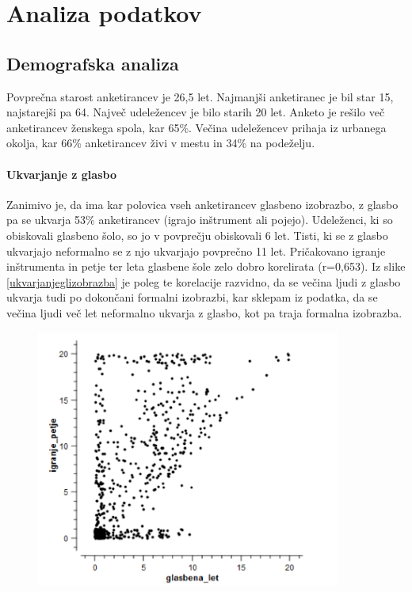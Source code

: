 \documentclass[a4paper, 12pt]{book}
\begin{document}
{\begin{table}[H]
\begin{center}
\begin{tabular}{| p{3.5cm} | p{4.5cm} | p{4.5cm} |}
\end{tabular}
\label{drugidel}
\end{center}
\end{table}

\section{Analiza podatkov}

\subsection{Demografska analiza}

Povprečna starost anketirancev je 26,5 let. Najmanjši anketiranec je bil star 15, najstarejši pa 64. Največ udeležencev je bilo starih 20 let. Anketo je rešilo več anketirancev ženskega spola, kar 65\%. Večina udeležencev prihaja iz urbanega okolja, kar 66\% anketirancev živi v mestu in 34\% na podeželju.

\paragraph{Ukvarjanje z glasbo}

Zanimivo je, da ima kar polovica vseh anketirancev glasbeno izobrazbo, z glasbo pa se ukvarja 53\% anketirancev (igrajo inštrument ali pojejo). Udeleženci, ki so obiskovali glasbeno šolo, so jo v povprečju obiskovali 6 let. Tisti, ki se z glasbo ukvarjajo neformalno se z njo ukvarjajo povprečno 11 let. Pričakovano igranje inštrumenta in petje ter leta glasbene šole zelo dobro korelirata (r=0,653). Iz slike \ref{ukvarjanjeglizobrazba} je poleg te korelacije razvidno, da se večina ljudi z glasbo ukvarja tudi po dokončani formalni izobrazbi, kar sklepam iz podatka, da se večina ljudi več let neformalno ukvarja z glasbo, kot pa traja formalna izobrazba. 

\begin{figure}[hbt]
\centering
\includegraphics[width=10cm]{images/izobrazba_ukvarjanje.png}


\end{figure}}
\end{document}
